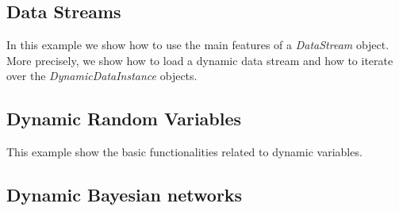 \documentclass[10pt,a4paper]{article}
\begin{document}
%
%
%
%
%


\subsection{Data Streams}\label{sec:dbns:datastreams}

In this example we show how to use the main features of a \textit{DataStream} object. More precisely, we show how to load a dynamic data stream and how to iterate over the \textit{DynamicDataInstance} objects.


\subsection{Dynamic Random Variables}\label{sec:dbns:variables}

This example show the basic functionalities related to dynamic variables.


\subsection{Dynamic Bayesian networks}\label{sec:dbns:dbns}
\end{document}
